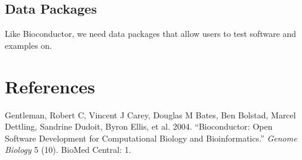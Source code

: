 \documentclass[]{elsarticle} %
\begin{document}
\subsection{Data Packages}\label{data-packages}

Like Bioconductor, we need data packages that allow users to test
software and examples on.

\section*{References}\label{references}

\hypertarget{refs}{}
\hypertarget{ref-gentleman2004bioconductor}{}
Gentleman, Robert C, Vincent J Carey, Douglas M Bates, Ben Bolstad,
Marcel Dettling, Sandrine Dudoit, Byron Ellis, et al. 2004.
``Bioconductor: Open Software Development for Computational Biology and
Bioinformatics.'' \emph{Genome Biology} 5 (10). BioMed Central: 1.
\end{document}
